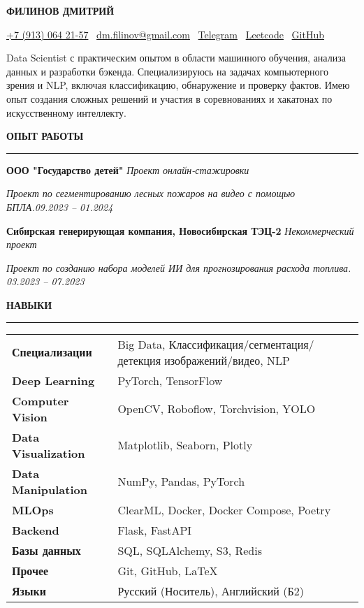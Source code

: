 \documentclass[10pt,a4paper]{article}
\newcommand{\sechead}[1]{%
  \noindent\textbf{#1}\par
  \vspace{-8pt}
  \noindent\rule{\linewidth}{0.4pt}\par\vspace{0.1cm}
}
\begin{document}
\begin{center}
  {\huge\rmfamily\bfseries ФИЛИНОВ ДМИТРИЙ}
\end{center}
\begin{center}
\href{tel:+79130642157}{+7 (913) 064 21-57} \textbar\ 
\href{mailto:dm.filinov@gmail.com}{dm.filinov@gmail.com} \textbar\
  \href{https://t.me/D1ffic00lt}{Telegram} \textbar\ 
  \href{https://leetcode.com/u/D1ffic00lt/}{Leetcode} \textbar\ 
  \href{https://github.com/D1ffic00lt}{GitHub}
\end{center}
Data Scientist с практическим опытом в области машинного обучения, анализа данных и разработки бэкенда. Специализируюсь на задачах компьютерного зрения и NLP, включая классификацию, обнаружение и проверку фактов. Имею опыт создания сложных решений и участия в соревнованиях и хакатонах по искусственному интеллекту.
\vspace{0.3cm}

\sechead{ОПЫТ РАБОТЫ}

\textbf{ООО "Государство детей"} \hfill \emph{Проект онлайн-стажировки}

	\textit{Проект по сегментированию лесных пожаров на видео с помощью БПЛА.}\hfill \emph{09.2023 – 01.2024}\vspace{0.2cm}
	
	\textbf{Сибирская генерирующая компания, Новосибирская ТЭЦ-2} \hfill \emph{Некоммерческий проект}
	
\textit{Проект по созданию набора моделей ИИ для прогнозирования расхода топлива.} \hfill \emph{03.2023 – 07.2023}\vspace{0.2cm}

\vspace{0.3cm}

\sechead{НАВЫКИ}

\begin{tabular}{@{}l p{0.75\textwidth\qquad}@{}}
\textbf{Специализации} & Big Data, Классификация/сегментация/детекция изображений/видео, NLP \\
\textbf{Deep Learning}   & PyTorch, TensorFlow \\
\textbf{Computer Vision}& OpenCV, Roboflow, Torchvision, YOLO \\
\textbf{Data Visualization}& Matplotlib, Seaborn, Plotly \\
\textbf{Data Manipulation}& NumPy, Pandas, PyTorch \\
\textbf{MLOps}           & ClearML, Docker, Docker Compose, Poetry \\
\textbf{Backend}         & Flask, FastAPI \\
\textbf{Базы данных}       & SQL, SQLAlchemy, S3, Redis \\
\textbf{Прочее}           & Git, GitHub, \LaTeX \\
\textbf{Языки}&Русский (Носитель), Английский (Б2)
\end{tabular}
\vspace{0.3cm}
\end{document}
